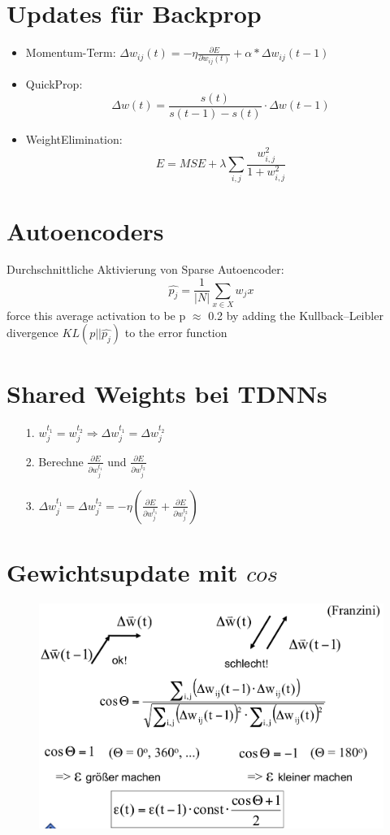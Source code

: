 \documentclass[paper=a4, fontsize=11pt]{scrartcl} %
\begin{document}
\section{Updates für Backprop}

\begin{itemize}
\item Momentum-Term: $\Delta w_{ij}(t) = - \eta \frac{\partial E}{\partial w_{ij}(t)} + \alpha * \Delta w_{ij}(t-1)$
\item QuickProp: \[
\Delta w(t) = \frac{s(t)}{s(t - 1) - s(t)} \cdot \Delta w(t-1)
\]
\item WeightElimination: \[
E = MSE + \lambda \sum_{i,j} \frac{w_{i,j}^2}{1 + w_{i,j}^2}
\]
\end{itemize}

\section{Autoencoders}
Durchschnittliche Aktivierung von Sparse Autoencoder: 
\[
\widehat{p_j} = \frac{1}{|N|} \sum_{x \in X} w_j x
\]
force this average activation to be p $\approx$ 0.2 by adding the Kullback–Leibler divergence $KL(p || \widehat{p_j})$ to the error function
\section{Shared Weights bei TDNNs}
\begin{itemize}
	\item[1.]$w_j^{t_1} = w_j^{t_2} \Rightarrow \Delta w_j^{t_1} = \Delta w_j^{t_2}$
	\item[2.]Berechne $\frac{\partial E}{\partial w_j^{t_1}}$ und $\frac{\partial E}{\partial w_j^{t_2}}$
	\item[3.] $\Delta w_j^{t_1} = \Delta w_j^{t_2} = -\eta \left(\frac{\partial E}{\partial w_j^{t_1}} + \frac{\partial E}{\partial w_j^{t_2}}\right)$
\end{itemize}


\section{Gewichtsupdate mit $cos$}

\begin{figure}[h]
\includegraphics[scale=0.3]{img/dynamic-learning-rate}
\end{figure}
\end{document}
